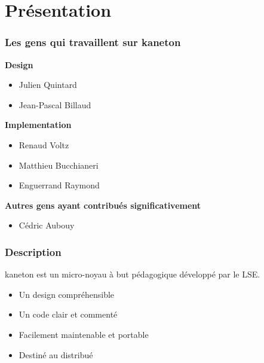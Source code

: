 \section{Pr\'{e}sentation}


\begin{frame}
  \frametitle{Les gens qui travaillent sur kaneton}

  \textbf{Design}

  \begin{itemize}
    \item
      Julien Quintard
    \item
      Jean-Pascal Billaud
  \end{itemize}

  \nl

  \textbf{Implementation}

  \begin{itemize}
    \item
      Renaud Voltz
    \item
      Matthieu Bucchianeri
    \item
      Enguerrand Raymond
  \end{itemize}

  \nl

  \textbf{Autres gens ayant contribu\'{e}s significativement}

  \begin{itemize}
    \item
      C\'{e}dric Aubouy
  \end{itemize}
\end{frame}


\begin{frame}
  \frametitle{Description}

  kaneton est un micro-noyau \`{a} but p\'{e}dagogique
  d\'{e}velopp\'{e} par le LSE.

  \-

  \begin{itemize}
  \item
    Un design compr\'{e}hensible
  \item
    Un code clair et comment\'{e}
  \item
    Facilement maintenable et portable
  \item
    Destin\'{e} au distribu\'{e}
  \end{itemize}

\end{frame}

